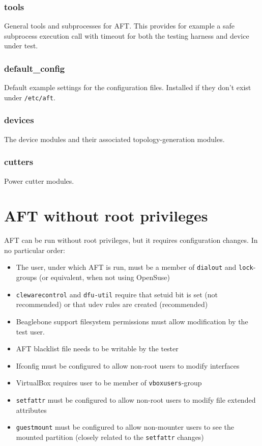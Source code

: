 \documentclass[a4paper,11pt]{article}
\newcommand{\cmd}[1]{\texttt{#1}}
\begin{document}
\subsubsection*{tools}
General tools and subprocesses for AFT. This provides for example a safe subprocess execution call with timeout for both the testing harness and device under test.

\subsubsection*{default\_config}
Default example settings for the configuration files. Installed if they don't exist under \cmd{/etc/aft}.

\subsubsection*{devices}
The device modules and their associated topology-generation modules.

\subsubsection*{cutters}
Power cutter modules.

\pagebreak

\section{AFT without root privileges}
\label{app:noroot}

AFT can be run without root privileges, but it requires configuration changes. In no particular order:

\begin{itemize}
\item The user, under which AFT is run, must be a member of \cmd{dialout} and \cmd{lock}-groups (or equivalent, when not using OpenSuse)
\item \cmd{clewarecontrol} and \cmd{dfu-util} require that setuid bit is set (not recommended) or that udev rules are created (recommended)
\item Beaglebone support filesystem permissions must allow modification by the test user.
\item AFT blacklist file needs to be writable by the tester
\item Ifconfig must be configured to allow non-root users to modify interfaces
\item VirtualBox requires user to be member of \cmd{vboxusers}-group
\item \cmd{setfattr} must be configured to allow non-root users to modify file extended attributes
\item \cmd{guestmount} must be configured to allow non-mounter users to see the mounted partition (closely related to the \cmd{setfattr} changes)

\end{itemize}
\end{document}
